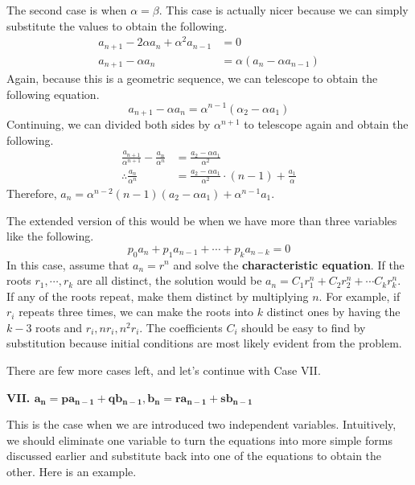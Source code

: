 \documentclass[../../../main.tex]{subfiles}
\begin{document}
The second case is when $\alpha = \beta$. This case is actually
nicer because we can simply substitute the values to obtain the
following.
\begin{align*}
    a_{n+1} - 2\alpha a_n + \alpha^2 a_{n-1} &= 0 \\
    a_{n+1} - \alpha a_n &= \alpha (a_n - \alpha a_{n-1})
\end{align*}
Again, because this is a geometric sequence, we can telescope
to obtain the following equation.
\[
a_{n+1} - \alpha a_n = \alpha^{n-1} (\alpha_2 - \alpha a_1)
\]
Continuing, we can divided both sides by $\alpha^{n+1}$ to telescope
again and obtain the following.
\begin{align*}
    \frac{a_{n+1}}{\alpha^{n+1}} - \frac{a_n}{\alpha^n}
    &= \frac{a_2 - \alpha a_1}{\alpha^2} \\
    \therefore
    \frac{a_n}{\alpha^n}
    &= \frac{a_2 - \alpha a_1}{\alpha^2} \cdot (n - 1)
        + \frac{a_1}{\alpha}
\end{align*}
Therefore, $a_n = \alpha^{n-2} (n-1) (a_2 - \alpha a_1) +
\alpha^{n-1} a_1$.

\begin{important}
The extended version of this would be when we have more than three
variables like the following.
\[
p_0 a_n + p_1 a_{n-1} + \cdots + p_{k} a_{n-k} = 0
\]
In this case, assume that $a_n = r^n$ and solve the
\textbf{characteristic equation}. If the roots $r_1, \cdots, r_k$
are all distinct, the solution would be $a_n = C_1 r_1^n +
C_2 r_2^n + \cdots C_k r_k^n$. If any of the roots repeat,
make them distinct by multiplying $n$. For example, if $r_i$
repeats three times, we can make the roots into $k$ distinct ones
by having the $k-3$ roots and $r_i, n r_i, n^2 r_i$. The coefficients
$C_i$ should be easy to find by substitution because initial
conditions are most likely evident from the problem.
\end{important}

There are few more cases left, and let's continue with Case VII.

{\Large\textcolor{BrickRed}
{\textbf{VII. $\mathbf{a_n = p a_{n-1} + q b_{n-1},
b_n = r a_{n-1} + s b_{n-1}}$}}}

This is the case when we are introduced two independent variables.
Intuitively, we should eliminate one variable to turn the equations
into more simple forms discussed earlier and substitute back into
one of the equations to obtain the other. Here is an example.
\end{document}
